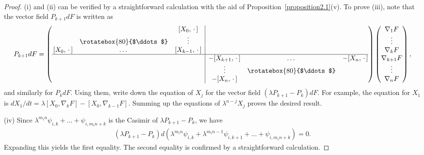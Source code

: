 \documentclass[pdftex]{sigma}
\numberwithin{equation}{section}
\begin{document}
\begin{proof}
(i) and (ii) can be verif\/ied by a straightforward calculation with the aid of Proposition~\ref{proposition2.1}(v). To prove (iii), note that the vector f\/ield $P_{k+1}dF$ is written as
\begin{gather*}
 P_{k+1}dF = \left(
\begin{array}{@{}ccc|ccc@{}}
 & & [X_0, \, \cdot \,] & & & \\
 & \rotatebox{80}{$\ddots$} & \vdots & & & \\
\,[X_0, \, \cdot \,] & \dots & [X_{k-1}, \, \cdot \,] & & & \\ \hline
 & & & -[X_{k+1}, \, \cdot \,] & \dots & -[X_n, \, \cdot \,] \\
 & & & \vdots & \rotatebox{80}{$\ddots$} & \\
 & & & -[X_n, \, \cdot \,] & & \\
\end{array}
\right) \left(
\begin{array}{@{}c@{}}
\nabla _1F \\
\vdots \\
\nabla _kF \\
\nabla _{k+1} F \\
\vdots \\
\nabla_n F
\end{array}
\right),
\end{gather*}
and similarly for $P_kdF$. Using them, write down the equation of $X_j$ for the vector f\/ield $(\lambda P_{k+1}-P_k)dF$. For example, the equation for $X_1$ is $dX_1/dt = \lambda [X_0, \nabla _kF]-[X_0,\nabla _{k-1}F]$. Summing up the equations of $\lambda ^{n-j}X_j$ proves the desired result.

(iv) Since $\lambda ^{m_in}\psi_{i,k} + \dots +\psi_{i,m_in+k}$ is the Casimir of $\lambda P_{k+1}-P_k$, we have
\begin{gather*}
(\lambda P_{k+1}-P_k) d(\lambda ^{m_in}\psi_{i,k} + \lambda ^{m_in-1}\psi_{i, k+1}+ \dots +\psi_{i,m_in+k})=0.
\end{gather*}
Expanding this yields the f\/irst equality. The second equality is conf\/irmed by a straightforward calculation.


\end{proof}
\end{document}

